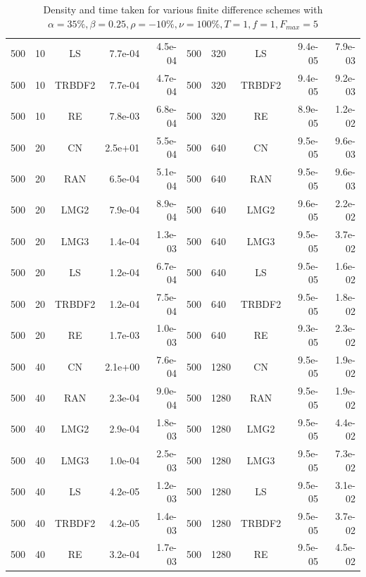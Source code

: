 \documentclass[]{rAMF2e}
\begin{document}
\begin{table}[h]
\begin{center}
\begin{tiny}
\begin{tabular}{|l|l|c|r|r||l|l|c|r|r|}
500 & 10 & LS & 7.7e-04 & 4.5e-04&     500 & 320 & LS & 9.4e-05 & 7.9e-03\\
500 & 10 & TRBDF2 & 7.7e-04 & 4.7e-04& 500 & 320 & TRBDF2 & 9.4e-05 & 9.2e-03\\
500 & 10 & RE & 7.8e-03 & 6.8e-04&     500 & 320 & RE & 8.9e-05 & 1.2e-02\\
500 & 20 & CN & 2.5e+01 & 5.5e-04&     500 & 640 & CN & 9.5e-05 & 9.6e-03\\
500 & 20 & RAN & 6.5e-04 & 5.1e-04&    500 & 640 & RAN & 9.5e-05 & 9.6e-03\\
500 & 20 & LMG2 & 7.9e-04 & 8.9e-04&   500 & 640 & LMG2 & 9.6e-05 & 2.2e-02\\
500 & 20 & LMG3 & 1.4e-04 & 1.3e-03&   500 & 640 & LMG3 & 9.5e-05 & 3.7e-02\\
500 & 20 & LS & 1.2e-04 & 6.7e-04&     500 & 640 & LS & 9.5e-05 & 1.6e-02\\
500 & 20 & TRBDF2 & 1.2e-04 & 7.5e-04& 500 & 640 & TRBDF2 & 9.5e-05 & 1.8e-02\\
500 & 20 & RE & 1.7e-03 & 1.0e-03&     500 & 640 & RE & 9.3e-05 & 2.3e-02\\
500 & 40 & CN & 2.1e+00 & 7.6e-04&     500 & 1280 & CN & 9.5e-05 & 1.9e-02\\
500 & 40 & RAN & 2.3e-04 & 9.0e-04&    500 & 1280 & RAN & 9.5e-05 & 1.9e-02\\
500 & 40 & LMG2 & 2.9e-04 & 1.8e-03&   500 & 1280 & LMG2 & 9.5e-05 & 4.4e-02\\
500 & 40 & LMG3 & 1.0e-04 & 2.5e-03&   500 & 1280 & LMG3 & 9.5e-05 & 7.3e-02\\
500 & 40 & LS & 4.2e-05 & 1.2e-03&     500 & 1280 & LS & 9.5e-05 & 3.1e-02\\
500 & 40 & TRBDF2 & 4.2e-05 & 1.4e-03& 500 & 1280 & TRBDF2 & 9.5e-05 & 3.7e-02\\
500 & 40 & RE & 3.2e-04 & 1.7e-03&     500 & 1280 & RE & 9.5e-05 & 4.5e-02\\\hline

\end{tabular}
\end{tiny}
\caption{Density and time taken for various finite difference schemes with $\alpha=35\%, \beta=0.25, \rho=-10\%, \nu=100\%, T=1, f=1, F_{max}=5$}
\end{center}
\end{table} 
\end{document}

